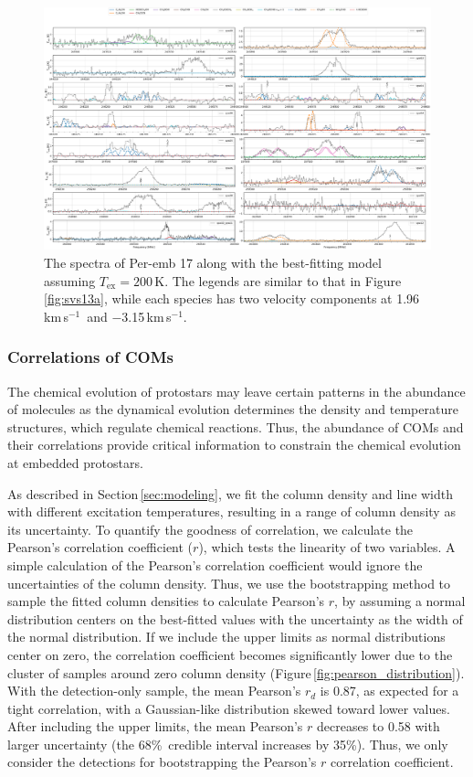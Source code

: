 \documentclass[twocolumn]{aastex62}
\newcommand{\kms}{\mbox{\,km\,s$^{-1}$}}
\begin{document}
\begin{figure}[htbp!]
  \centering
  \includegraphics[angle=90, height=\textheight]{Set1_ID06_200.pdf}
  \caption{The spectra of Per-emb 17 along with the best-fitting model assuming $T_\text{ex} = 200$\,K.  The legends are similar to that in Figure\,\ref{fig:svs13a}, while each species has two velocity components at 1.96\kms\ and $-$3.15\kms.}
  \label{fig:per17}
\end{figure}

\subsubsection{Correlations of COMs}
The chemical evolution of protostars may leave certain patterns in the abundance of molecules as the dynamical evolution determines the density and temperature structures, which regulate chemical reactions.  Thus, the abundance of COMs and their correlations provide critical information to constrain the chemical evolution at embedded protostars.

As described in Section\,\ref{sec:modeling}, we fit the column density and line width with different excitation temperatures, resulting in a range of column density as its uncertainty.  To quantify the goodness of correlation, we calculate the Pearson's correlation coefficient ($r$), which tests the linearity of two variables.  A simple calculation of the Pearson's correlation coefficient would ignore the uncertainties of the column density.  Thus, we use the bootstrapping method to sample the fitted column densities to calculate Pearson's $r$, by assuming a normal distribution centers on the best-fitted values with the uncertainty as the width of the normal distribution.  If we include the upper limits as normal distributions center on zero, the correlation coefficient becomes significantly lower due to the cluster of samples around zero column density (Figure\,\ref{fig:pearson_distribution}).  With the detection-only sample, the mean Pearson's $r_{d}$ is 0.87, as expected for a tight correlation, with a Gaussian-like distribution skewed toward lower values.  After including the upper limits, the mean Pearson's $r$ decreases to 0.58 with larger uncertainty (the 68\%\ credible interval increases by 35\%).  Thus, we only consider the detections for bootstrapping the Pearson's $r$ correlation coefficient.
\end{document}
